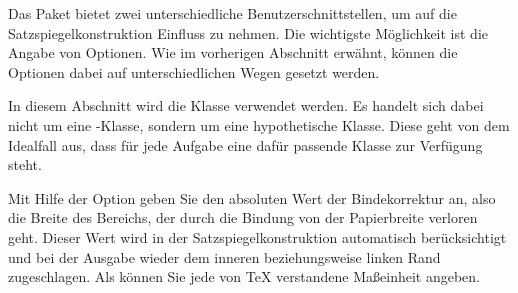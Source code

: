Das Paket  bietet zwei unterschiedliche
Benutzerschnittstellen, um auf die Satzspiegelkonstruktion Einfluss zu
nehmen. Die wichtigste Möglichkeit ist die Angabe von Optionen. Wie
im vorherigen Abschnitt erwähnt, können die Optionen dabei auf
unterschiedlichen Wegen gesetzt werden.

In diesem Abschnitt wird die Klasse 
verwendet werden. Es handelt sich dabei nicht um eine \KOMAScript-Klasse,
sondern um eine hypothetische Klasse. Diese geht
von dem Idealfall aus, dass für jede Aufgabe eine dafür passende Klasse zur
Verfügung steht.


\begin{Declaration}
\end{Declaration}%
Mit Hilfe der Option
 geben Sie
den absoluten Wert der
Bindekorrektur an, also die
Breite des Bereichs, der durch die Bindung von der Papierbreite verloren
geht. Dieser Wert wird in der Satzspiegelkonstruktion automatisch
berücksichtigt und bei der Ausgabe wieder dem inneren beziehungsweise linken
Rand zugeschlagen. Als  können Sie jede von \TeX{}
verstandene Maßeinheit angeben.

